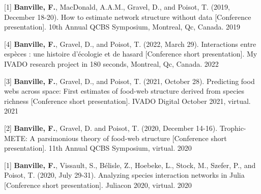 \begin{cventries}
  \cventry
    {[1] \textbf{Banville, F.}, MacDonald, A.A.M., Gravel, D., and Poisot, T. (2019, December 18-20). How to estimate network structure without data [Conference presentation]. 10th Annual QCBS Symposium, Montreal, Qc, Canada.}
    {} {} {2019} 
    {
      \begin{cvitems} %
      \end{cvitems}
    }

\end{cventries}


\begin{cventries}

  \cventry
    {[4] \textbf{Banville, F.}, Gravel, D., and Poisot, T. (2022, March 29). Interactions entre espèces : une histoire d’écologie et de hasard [Conference short presentation]. My IVADO research project in 180 seconds, Montreal, Qc, Canada.}
    {} {} {2022} 
    {
      \begin{cvitems} %
      \end{cvitems}
    }

  \cventry
    {[3] \textbf{Banville, F.}, Gravel, D., and Poisot, T. (2021, October 28). Predicting food webs across space: First estimates of food-web structure derived from species richness [Conference short presentation]. IVADO Digital October 2021, virtual.}
    {} {} {2021} 
    {
      \begin{cvitems} %
      \end{cvitems}
    }

  \cventry
    {[2] \textbf{Banville, F.}, Gravel, D. and Poisot, T. (2020, December 14-16). Trophic-METE: A parsimonious theory of food-web structure [Conference short presentation]. 11th Annual QCBS Symposium, virtual.}
    {} {} {2020} 
    {
      \begin{cvitems} %
      \end{cvitems}
    }

  \cventry
    {[1] \textbf{Banville, F.}, Vissault, S., Bélisle, Z., Hoebeke, L., Stock, M., Szefer, P., and Poisot, T. (2020, July 29-31). Analyzing species interaction networks in Julia [Conference short presentation]. Juliacon 2020, virtual.}
    {} {} {2020} 
    {
      \begin{cvitems} %
      \end{cvitems}
    }


\end{cventries}



